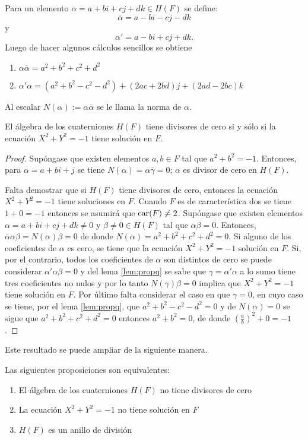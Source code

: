 Para un elemento $\alpha = a + bi + cj + dk \in H(F)$ se define:
\begin{equation*}
\overline{\alpha} = a - bi - cj -dk
\end{equation*}
y 
\begin{equation*}
\alpha'= a - bi +cj + dk.
\end{equation*}
Luego de hacer algunos cálculos sencillos se obtiene
\begin{lema}\label{lem:propq}
\begin{enumerate}
\item $\alpha\overline{\alpha} = a^2 + b^2 + c^2 + d^2$
\item $\alpha'\alpha = (a^2 + b^2 - c^2 -d^2) + (2ac + 2bd)j + (2ad -2bc)k$
\end{enumerate}
Al escalar $N(\alpha) := \alpha\overline{\alpha}$ se le llama la norma de $\alpha$.
\end{lema}
\begin{proposicion}
El álgebra de los cuaterniones $H(F)$ tiene divisores de cero si y sólo si la ecuación $X^2 + Y^2 = -1$ tiene solución en $F$.
\end{proposicion}
\begin{proof}
Supóngase que existen elementos $a,b \in F$ tal que $a^2 + b^2 = -1$. Entonces, para $\alpha = a + bi + j$ se tiene $N(\alpha) = \alpha\overline{\gamma} = 0$; $\alpha$ es divisor de cero en $H(F)$.

Falta demostrar que si $H(F)$ tiene divisores de cero, entonces la ecuación $X^2 + Y^2 = -1$ tiene soluciones en $F$. Cuando $F$ es de característica dos se tiene $1 + 0 = -1$ entonces se asumirá que $\operatorname{car} (F) \neq 2$. Supóngase que existen elementos $\alpha = a + bi + cj + dk \neq 0$ y $\beta \neq 0 \in H(F)$ tal que $\alpha\beta = 0 $. Entonces, $\overline{\alpha}\alpha\beta = N(\alpha)\beta = 0 $ de donde $N(\alpha) = a^2 +b^2 + c^2 + d^2 = 0$. Si alguno de los coeficientes de $\alpha$ es cero, se tiene que la ecuación $X^2 + Y^2 =-1$ solución en $F$. Si, por el contrario, todos los coeficientes de $\alpha$ son distintos de cero se puede considerar $\alpha'\alpha\beta = 0$ y del lema \ref{lem:propq} se sabe que $\gamma = \alpha'\alpha$ a lo sumo tiene tres coeficientes no nulos y por lo tanto $N(\gamma)\beta = 0$ implica que $X^2 + Y^2 = -1$ tiene solución en $F$. Por último falta considerar el caso en que $\gamma = 0$, en cuyo caso se tiene, por el lema \ref{lem:propq}, que $a^2 + b^2 -c^2 -d^2 = 0 $ y de $N(\alpha) = 0 $ se sigue  que $a^2 + b^2 + c^2 + d^2 = 0 $ entonces $a^2 + b^2 = 0$, de donde $\left( \frac{a}{b} \right)^2 + 0 = -1$.
\end{proof}
Este resultado se puede ampliar de la siguiente manera.
\begin{proposicion}
Las siguientes proposiciones son equivalentes:
\begin{enumerate}
\item El álgebra de los cuaterniones $H(F)$ no tiene divisores de cero
\item La ecuación $X^2 + Y^2 = -1$ no tiene solución en $F$
\item $H(F)$ es un anillo de división
\end{enumerate}
\end{proposicion}

